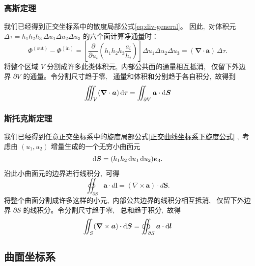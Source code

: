 \subsubsection{高斯定理}
我们已经得到正交坐标系中的散度局部公式\ref{eq:div-general}。
因此, \,对体积元
$\Delta\tau=h_1h_2h_3\,\Delta u_1\Delta u_2\Delta u_3$
的六个面计算净通量时：
\[
\Phi^{(\text{out})}-\Phi^{(\text{in})}
=\left[\frac{\partial}{\partial u_i}
\left(h_1h_2h_3\frac{a_i}{h_i}\right)\right]
\Delta u_1\Delta u_2\Delta u_3
=(\boldsymbol{\nabla}\cdot\boldsymbol a)\,\Delta\tau.
\]
将整个区域 $V$ 分割成许多此类体积元, \,内部公共面的通量相互抵消, \,
仅留下外边界 $\partial V$ 的通量。令分割尺寸趋于零, \,
通量和体积和分别趋于各自积分, \,故得到
\begin{equation}
\iiint_V (\boldsymbol{\nabla} \cdot \boldsymbol{a})  \dif\tau
= \iint_{\partial V} \boldsymbol{a} \cdot \dif \boldsymbol{S}
\end{equation}
\subsubsection{斯托克斯定理}
我们已经得到任意正交坐标系中的旋度局部公式\ref{正交曲线坐标系下旋度公式}
, \,考虑由 $(u_1,u_2)$ 增量生成的一个无穷小曲面元
\[
\dif\boldsymbol S=(h_1h_2\dif u_1\dif u_2)\boldsymbol e_3
.
\]
沿此小曲面元的边界进行线积分, \,可得
\[
\oiint_{\partial S}\boldsymbol a\cdot d\boldsymbol l
=(\nabla\times\boldsymbol a)\cdot d\boldsymbol S.
\]
将整个曲面分割成许多这样的小元, \,内部公共边界的线积分相互抵消, \,
仅留下外边界 $\partial S$ 的线积分。令分割尺寸趋于零, \,
总和趋于积分, \,故得
\begin{equation}
\iint_{S} (\boldsymbol{\nabla} \times \boldsymbol{a}) \cdot \dif \boldsymbol{S}
= \oiint_{\partial S} \boldsymbol{a} \cdot \dif \boldsymbol{l}
\end{equation}
\subsection{曲面坐标系}
